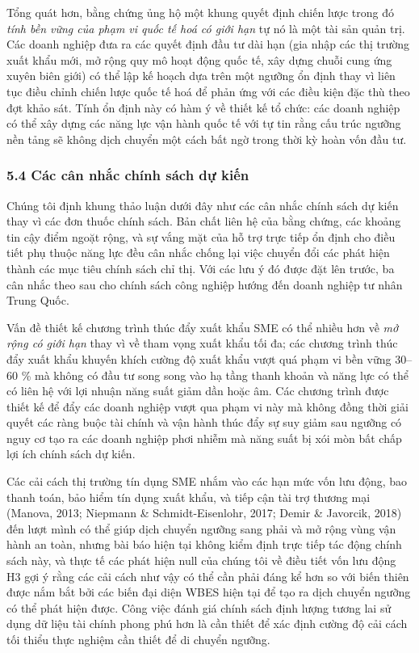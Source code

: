 \documentclass[12pt,a4paper]{article}
\begin{document}
Tổng quát hơn, bằng chứng ủng hộ một khung quyết định chiến lược trong
đó \emph{tính bền vững của phạm vi quốc tế hoá có giới hạn} tự nó là một
tài sản quản trị. Các doanh nghiệp đưa ra các quyết định đầu tư dài hạn
(gia nhập các thị trường xuất khẩu mới, mở rộng quy mô hoạt động quốc
tế, xây dựng chuỗi cung ứng xuyên biên giới) có thể lập kế hoạch dựa
trên một ngưỡng ổn định thay vì liên tục điều chỉnh chiến lược quốc tế
hoá để phản ứng với các điều kiện đặc thù theo đợt khảo sát. Tính ổn
định này có hàm ý về thiết kế tổ chức: các doanh nghiệp có thể xây dựng
các năng lực vận hành quốc tế với tự tin rằng cấu trúc ngưỡng nền tảng
sẽ không dịch chuyển một cách bất ngờ trong thời kỳ hoàn vốn đầu tư.

\hypertarget{54-cuxe1c-cuxe2n-nhux1eafc-chuxednh-suxe1ch-dux1ef1-kiux1ebfn}{%
\subsubsection{5.4 Các cân nhắc chính sách dự
kiến}\label{54-cuxe1c-cuxe2n-nhux1eafc-chuxednh-suxe1ch-dux1ef1-kiux1ebfn}}

Chúng tôi định khung thảo luận dưới đây như các cân nhắc chính sách dự
kiến thay vì các đơn thuốc chính sách. Bản chất liên hệ của bằng chứng,
các khoảng tin cậy điểm ngoặt rộng, và sự vắng mặt của hỗ trợ trực tiếp
ổn định cho điều tiết phụ thuộc năng lực đều cân nhắc chống lại việc
chuyển đổi các phát hiện thành các mục tiêu chính sách chỉ thị. Với các
lưu ý đó được đặt lên trước, ba cân nhắc theo sau cho chính sách công
nghiệp hướng đến doanh nghiệp tư nhân Trung Quốc.

Vấn đề thiết kế chương trình thúc đẩy xuất khẩu SME có thể nhiều hơn về
\emph{mở rộng có giới hạn} thay vì về tham vọng xuất khẩu tối đa; các
chương trình thúc đẩy xuất khẩu khuyến khích cường độ xuất khẩu vượt quá
phạm vi bền vững 30--60 \% mà không có đầu tư song song vào hạ tầng
thanh khoản và năng lực có thể có liên hệ với lợi nhuận năng suất giảm
dần hoặc âm. Các chương trình được thiết kế để đẩy các doanh nghiệp vượt
qua phạm vi này mà không đồng thời giải quyết các ràng buộc tài chính và
vận hành thúc đẩy sự suy giảm sau ngưỡng có nguy cơ tạo ra các doanh
nghiệp phơi nhiễm mà năng suất bị xói mòn bất chấp lợi ích chính sách dự
kiến.

Các cải cách thị trường tín dụng SME nhắm vào các hạn mức vốn lưu động,
bao thanh toán, bảo hiểm tín dụng xuất khẩu, và tiếp cận tài trợ thương
mại (Manova, 2013; Niepmann \& Schmidt-Eisenlohr, 2017; Demir \&
Javorcik, 2018) đến lượt mình có thể giúp dịch chuyển ngưỡng sang phải
và mở rộng vùng vận hành an toàn, nhưng bài báo hiện tại không kiểm định
trực tiếp tác động chính sách này, và thực tế các phát hiện null của
chúng tôi về điều tiết vốn lưu động H3 gợi ý rằng các cải cách như vậy
có thể cần phải đáng kể hơn so với biến thiên được nắm bắt bởi các biến
đại diện WBES hiện tại để tạo ra dịch chuyển ngưỡng có thể phát hiện
được. Công việc đánh giá chính sách định lượng tương lai sử dụng dữ liệu
tài chính phong phú hơn là cần thiết để xác định cường độ cải cách tối
thiểu thực nghiệm cần thiết để di chuyển ngưỡng.
\end{document}
